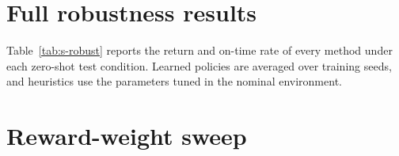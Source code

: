 \section{Full robustness results}\label{sec:s-robust}
Table~\ref{tab:s-robust} reports the return and on-time rate of every method under each zero-shot test condition. Learned policies are averaged over training seeds, and heuristics use the parameters tuned in the nominal environment.

\begin{table}[h]
\centering
\caption{Zero-shot robustness: return / on-time rate on 500 test days per condition. Bold marks the best return.}
\label{tab:s-robust}
\small
\resizebox{\textwidth}{!}{}
\end{table}

\section{Reward-weight sweep}\label{sec:s-pareto}
\begin{table}[h]
\centering
\caption{AA-DQN as a function of the fatigue weight $\lambda$ (attention weight $\mu=\lambda/2$; mean $\pm$ s.d.\ over three seeds).}
\label{tab:s-pareto}
\small

\end{table}
